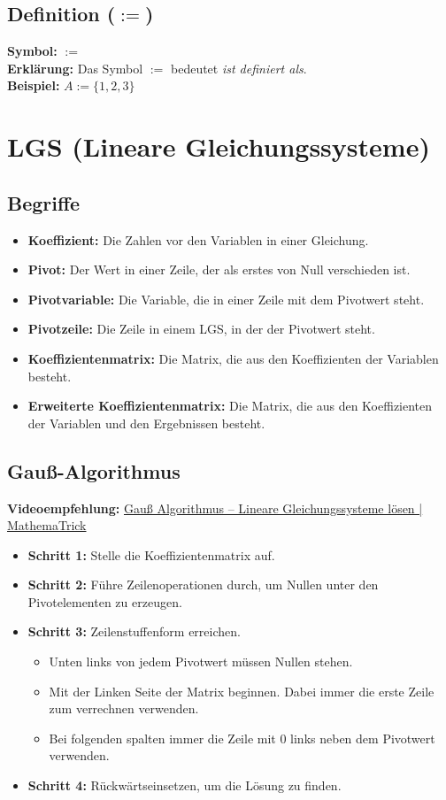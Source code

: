 \documentclass[12pt,a4paper]{article}
\begin{document}
\subsection{Definition (\texorpdfstring{$:=$}{:=})}
\textbf{Symbol:} $:=$ \\
\textbf{Erklärung:} Das Symbol $:=$ bedeutet \textit{ist definiert als}. \\
\textbf{Beispiel:} $A := \{1,2,3\}$


\section{LGS (Lineare Gleichungssysteme)}
\subsection{Begriffe}
\begin{itemize}
    \item \textbf{Koeffizient:} Die Zahlen vor den Variablen in einer Gleichung.
    \item \textbf{Pivot:} Der Wert in einer Zeile, der als erstes von Null verschieden ist.
    \item \textbf{Pivotvariable:} Die Variable, die in einer Zeile mit dem Pivotwert steht.
    \item \textbf{Pivotzeile:} Die Zeile in einem LGS, in der der Pivotwert steht.
    \item \textbf{Koeffizientenmatrix:} Die Matrix, die aus den Koeffizienten der Variablen besteht.
    \item \textbf{Erweiterte Koeffizientenmatrix:} Die Matrix, die aus den Koeffizienten der Variablen und den Ergebnissen besteht.
\end{itemize}

\subsection{Gauß-Algorithmus}
\textbf{Videoempfehlung:} \href{https://youtu.be/aosbq7Ci7Ec}{Gauß Algorithmus – Lineare Gleichungssysteme lösen | MathemaTrick}
\begin{itemize}
    \item \textbf{Schritt 1:} Stelle die Koeffizientenmatrix auf.
    \item \textbf{Schritt 2:} Führe Zeilenoperationen durch, um Nullen unter den Pivotelementen zu erzeugen.
    \item \textbf{Schritt 3:} Zeilenstuffenform erreichen.
    \begin{itemize}
        \item Unten links von jedem Pivotwert müssen Nullen stehen.
        \item Mit der Linken Seite der Matrix beginnen. Dabei immer die erste Zeile zum verrechnen verwenden.
        \item Bei folgenden spalten immer die Zeile mit 0 links neben dem Pivotwert verwenden.
    \end{itemize}
    \item \textbf{Schritt 4:} Rückwärtseinsetzen, um die Lösung zu finden.
\end{itemize}
\end{document}
